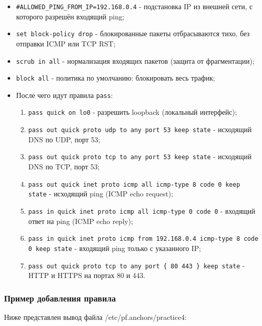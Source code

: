 \documentclass[areasetadvanced]{scrartcl}
\begin{document}
\begin{itemize}
    \item \texttt{\#ALLOWED\_PING\_FROM\_IP=192.168.0.4} - подстановка IP из внешней сети, с которого разрешён входящий ping;
    \item \texttt{set block-policy drop} - блокированные пакеты отбрасываются тихо, без отправки ICMP или TCP RST;
    \item \texttt{scrub in all} - нормализация входящих пакетов (защита от фрагментации);
    \item \texttt{block all} - политика по умолчанию: блокировать весь трафик;
    \item После чего идут правила \texttt{pass}: \begin{enumerate}
        \item \texttt{pass quick on lo0} - разрешить loopback (локальный интерфейс);
        \item \texttt{pass out quick proto udp to any port 53 keep state} - исходящий DNS по UDP, порт 53;
        \item \texttt{pass out quick proto tcp to any port 53 keep state} - исходящий DNS по TCP, порт 53;
        \item \texttt{pass out quick inet proto icmp all icmp-type 8 code 0 keep state} - исходящий ping (ICMP echo request);
        \item \texttt{pass in quick inet proto icmp all icmp-type 0 code 0} - входящий ответ на ping (ICMP echo reply);
        \item \texttt{pass in quick inet proto icmp from 192.168.0.4 icmp-type 8 code 0 keep state} - входящий ping только с указанного IP;
        \item \texttt{pass out quick proto tcp to any port \{ 80 443 \} keep state} - HTTP и HTTPS на портах 80 и 443.
    \end{enumerate}
\end{itemize}

\subsubsection{Пример добавления правила}
Ниже представлен вывод файла /etc/pf.anchors/practice4:
\end{document}
